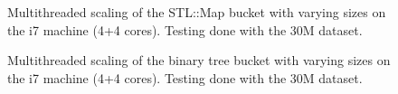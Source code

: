 \begin{landscape}
\begin{figure}[!h]
{        }
        \label{fig:ts_i7_30m_map}
        \caption{Multithreaded scaling of the STL::Map bucket with varying sizes on the
        i7 machine (4+4 cores). Testing done with the 30M dataset.}
    \end{figure}
    \begin{figure}[!h]
        \label{fig:ts_i7_30m_btree}
        \caption{Multithreaded scaling of the binary tree bucket with varying sizes on the
        i7 machine (4+4 cores). Testing done with the 30M dataset.}
    \end{figure}
\end{landscape}

